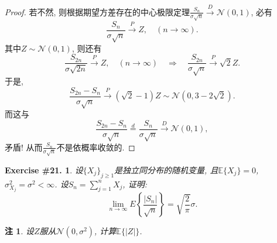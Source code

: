 \documentclass[UTF8, a4paper]{article}
\newtheorem{exercise}{Exercise \#21.}
\newtheorem*{remark}{注}
\begin{document}
\begin{proof}
若不然, 则根据期望方差存在的中心极限定理\(\frac{S_n}{\sigma \sqrt{n}} \xrightarrow{D} \mathcal{N}(0,1 )\), 必有
$$
\frac{S_n}{\sigma \sqrt{n}} \xrightarrow{P} Z, \quad (n \to \infty).
$$
其中\(Z \sim \mathcal{N}(0, 1)\),
则还有
$$
\frac{S_{2n}}{\sigma \sqrt{2n}} \xrightarrow{P} Z, \quad (n \to \infty) \quad \Rightarrow \quad \frac{S_{2n}}{\sigma \sqrt{n}} \xrightarrow{P} \sqrt{2} Z.
$$
于是, 
$$
\frac{S_{2n} - S_n}{\sigma \sqrt{n}} \xrightarrow{P} (\sqrt{2} - 1)Z \sim \mathcal{N}(0, 3 - 2\sqrt{2}).
$$
而这与
$$
\frac{S_{2n} - S_n}{\sigma \sqrt{n}} \overset{d}{=} \frac{S_n}{\sigma \sqrt{n}} \xrightarrow{D} \mathcal{N}(0, 1),
$$
矛盾! 从而\(\frac{S_n}{\sigma \sqrt{n}}\)不是依概率收敛的.
\end{proof}

\begin{framed}
\begin{exercise}
设\(\{X_j\}_{j\geq 1}\)是独立同分布的随机变量, 且\(\mathbb{E}\{X_j\} = 0\), \(\sigma_{X_j}^2 = \sigma^2 < \infty\).
设\(S_n = \sum_{j=1}^{n}X_j\), 证明:
$$
\lim _{n \rightarrow \infty} E\left\{\frac{\left|S_n\right|}{\sqrt{n}}\right\}=\sqrt{\frac{2}{\pi}} \sigma .
$$
\end{exercise}
\end{framed}
\begin{remark}
设\(Z\)服从\(\mathcal{N}(0, \sigma^2)\), 计算\(\mathbb{E}\{|Z|\}\).
\end{remark}
\end{document}
